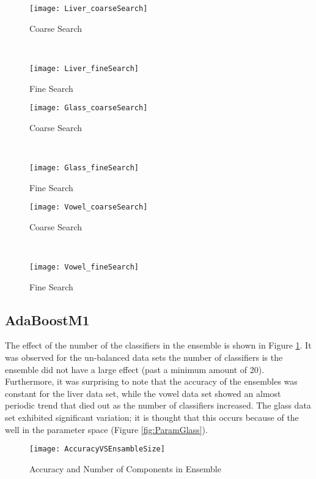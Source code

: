 \begin{figure*}[!ht]
	\centering
	\begin{subfigure}[b]{0.41\textwidth}
		\centering
		\texttt{[image: Liver\_coarseSearch]}
        \caption{Coarse Search}
	\end{subfigure}%
	~
	\begin{subfigure}[b]{0.41\textwidth}
		\centering
		\texttt{[image: Liver\_fineSearch]}
        \caption{Fine Search}
	\end{subfigure}	
	\caption{Parameter search for Liver Disorder}
	\label{fig:ParamLiver}

	\begin{subfigure}[b]{0.41\textwidth}
		\centering
		\texttt{[image: Glass\_coarseSearch]}
        \caption{Coarse Search}
	\end{subfigure}%
	~
	\begin{subfigure}[b]{0.41\textwidth}
		\centering
		\texttt{[image: Glass\_fineSearch]}
        \caption{Fine Search}
	\end{subfigure}	
	\caption{Parameter search for Glass Disorder}
	\label{fig:ParamGlass}

	\begin{subfigure}[b]{0.41\textwidth}
		\centering
		\texttt{[image: Vowel\_coarseSearch]}
        \caption{Coarse Search}
	\end{subfigure}%
	~
	\begin{subfigure}[b]{0.41\textwidth}
		\centering
		\texttt{[image: Vowel\_fineSearch]}
        \caption{Fine Search}
	\end{subfigure}	
	\caption{Parameter search for Vowel Disorder}
	\label{fig:ParamVowel}
\end{figure*}

\subsection{AdaBoostM1}
\label{sec:Results_AdaBoost}
The effect of the number of the classifiers in the ensemble is shown in Figure \ref{fig:AccuracyEnsambleSize}.
It was observed for the un-balanced data sets the number of classifiers is the ensemble did not have a large effect (past a minimum amount of 20).
Furthermore, it was surprising to note that the accuracy of the ensembles was constant for the liver data set, while the vowel data set showed an almost periodic trend that died out as the number of classifiers increased.
The glass data set exhibited significant variation; it is thought that this occurs because of the well in the parameter space (Figure \ref{fig:ParamGlass}).
\begin{figure}[!ht]
    \centering
    \texttt{[image: AccuracyVSEnsambleSize]}
    \caption{Accuracy and Number of Components in Ensemble}
    \label{fig:AccuracyEnsambleSize}
\end{figure}

